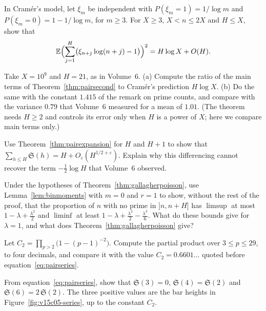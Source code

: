 \begin{exercise}[$\star$]\label{ex:cramervar}
In Cram\'er's model, let $\xi_m$ be independent with $P(\xi_m=1)=1/\log m$ and $P(\xi_m=0)=1-1/\log m$, for $m\ge3$. For $X\ge3$, $X<n\le2X$ and $H\le X$, show that
\[
\mathbb E\Bigl(\sum_{j=1}^H\bigl(\xi_{n+j}\log(n+j)-1\bigr)\Bigr)^2=H\log X+O(H).
\]
\end{exercise}

\begin{exercise}[$\star$]\label{ex:volume6check}
Take $X=10^9$ and $H=21$, as in Volume~6. (a) Compute the ratio of the main terms of Theorem~\ref{thm:pairsecond} to Cram\'er's prediction $H\log X$. (b) Do the same with the constant $1.415$ of the remark on prime counts, and compare with the variance $0.79$ that Volume~6 measured for a mean of $1.01$. (The theorem needs $H\ge2$ and controls its error only when $H$ is a power of $X$; here we compare main terms only.)
\end{exercise}

\begin{exercise}[$\star\star$]\label{ex:paircheck}
Use Theorem~\ref{thm:pairexpansion} for $H$ and $H+1$ to show that $\sum_{h\le H}\mathfrak S(h)=H+O_\varepsilon(H^{1/2+\varepsilon})$. Explain why this differencing cannot recover the term $-\frac12\log H$ that Volume~6 observed.
\end{exercise}

\begin{exercise}[$\star\star$]\label{ex:poissonzero}
Under the hypotheses of Theorem~\ref{thm:gallagherpoisson}, use Lemma~\ref{lem:binmoments} with $m=0$ and $r=1$ to show, without the rest of the proof, that the proportion of $n$ with no prime in $]n,n+H]$ has $\limsup$ at most $1-\lambda+\frac{\lambda^2}2$ and $\liminf$ at least $1-\lambda+\frac{\lambda^2}2-\frac{\lambda^3}6$. What do these bounds give for $\lambda=1$, and what does Theorem~\ref{thm:gallagherpoisson} give?
\end{exercise}

\begin{exercise}[$\star$]\label{ex:v15-05-1}
Let \(C_2=\prod_{p>2}\bigl(1-(p-1)^{-2}\bigr)\). Compute the partial product over \(3\le p\le29\), to four decimals, and compare it with the value \(C_2=0.6601\ldots\) quoted before equation~\eqref{eq:pairseries}.
\end{exercise}

\begin{exercise}[$\star$]\label{ex:v15-05-2}
From equation~\eqref{eq:pairseries}, show that \(\mathfrak S(3)=0\), \(\mathfrak S(4)=\mathfrak S(2)\) and \(\mathfrak S(6)=2\,\mathfrak S(2)\). The three positive values are the bar heights in Figure~\ref{fig:v15c05-series}, up to the constant \(C_2\).
\end{exercise}

